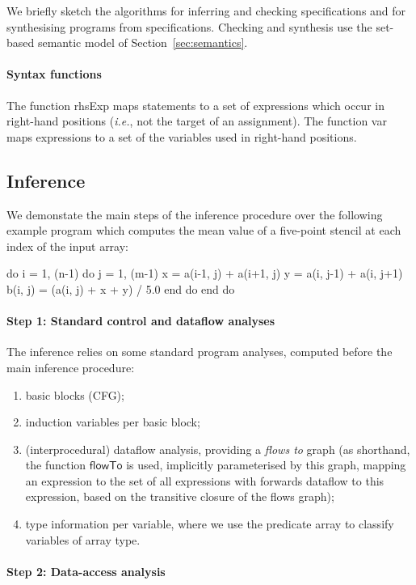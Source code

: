 \documentclass[9pt]{sigplanconf}
\newcounter{block}
\theoremstyle{definition}
\newcommand{\ie}{\emph{i.e.}}
\newcommand{\arrayTy}{\textsf{array}}
\newcommand{\rhsExp}{\textsf{rhsExp}}
\newcommand{\var}{\textsf{var}}
\begin{document}
\noindent
We briefly sketch the algorithms for inferring and checking
specifications and for synthesising programs from specifications.
Checking and synthesis use the set-based semantic model of
Section~\ref{sec:semantics}. 

\paragraph{Syntax functions}
The function \rhsExp{} maps statements to a
set of expressions which occur in right-hand positions (\ie{}, not the
target of an assignment). The function \var{} maps expressions to a
set of the variables used in right-hand positions.

\subsection{Inference}

We demonstate the main steps of the inference procedure over the
following example program which computes the mean value 
of a five-point stencil at each index of the input array:
\begin{ExmVerbatim}
do i = 1, (n-1)
   do j = 1, (m-1)
      x       = a(i-1, j) + a(i+1, j) 
      y       = a(i, j-1) + a(i, j+1)
      b(i, j) = (a(i, j) + x + y) / 5.0
   end do
end do
\end{ExmVerbatim}
\paragraph{Step 1: Standard control and dataflow analyses}
The inference relies on some standard program analyses, computed
before the main inference procedure:
%
\begin{enumerate}
\item basic blocks (CFG);
\item induction variables per basic block;
\item (interprocedural) dataflow analysis, providing a \emph{flows to}
  graph (as shorthand, the function
  $\mathsf{flowTo}$ is used, implicitly parameterised by this graph,  
  mapping an expression to the set of all expressions
  with forwards dataflow to this expression, based on the transitive
  closure of the flows graph);
\item type information per variable, where we use the predicate
\arrayTy{} to classify variables of array type. 
\end{enumerate}
%

\paragraph{Step 2: Data-access analysis}
\end{document}
